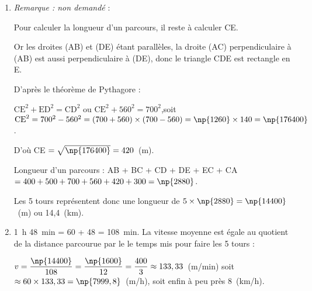 
%

\begin{enumerate}[resume]
\item %
\emph{Remarque : non demandé} : 

Pour calculer la longueur d'un parcours, il reste à calculer CE.

Or les droites (AB) et (DE) étant parallèles, la droite (AC) perpendiculaire à (AB) est aussi perpendiculaire à (DE), donc le triangle CDE est rectangle en E.

D'après le théorème de Pythagore :

$\text{CE}^2 + \text{ED}^2 = \text{CD}^2$ ou $\text{CE}^2 + 560^2 = 700^2$,soit $\text{CE}^2 = 700^2 - 560^2 = (700+560)\times (700-560) = \np{1260} \times 140 = \np{176400} $.

D'où CE $= \sqrt{\np{176400}} = 420$~(m).

Longueur d'un parcours : AB + BC + CD + DE + EC + CA $= 400 + 500 + 700 + 560 + 420 + 300 = \np{2880}$.

Les 5 tours représentent donc une longueur de $5 \times \np{2880} = \np{14400}$~(m) ou 14,4~(km).
\item %
1~h 48~min = 60 + 48 = 108~min.
La vitesse moyenne est égale au quotient de la distance parcourue par le le temps mis pour faire les 5 tours :

$v = \dfrac{\np{14400}}{108}= \dfrac{\np{1600}}{12}= \dfrac{400}{3} \approx 133,33$~(m/min) soit $\approx 60 \times 133,33 = \np{7999,8}$~(m/h), soit enfin à peu près 8~(km/h).
\end{enumerate}

\vspace{0,5cm}

